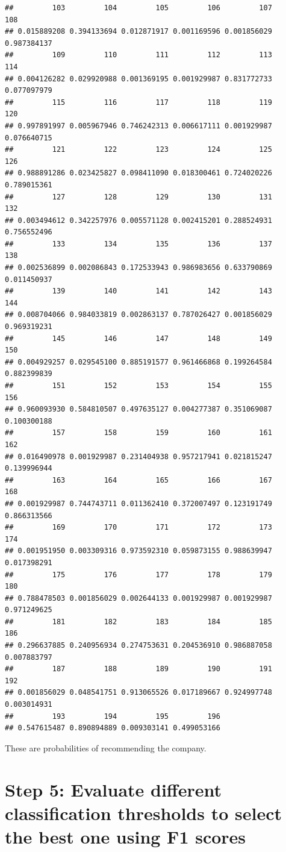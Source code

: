 \documentclass[
]{article}
\begin{document}
\begin{verbatim}
##         103         104         105         106         107         108 
## 0.015889208 0.394133694 0.012871917 0.001169596 0.001856029 0.987384137 
##         109         110         111         112         113         114 
## 0.004126282 0.029920988 0.001369195 0.001929987 0.831772733 0.077097979 
##         115         116         117         118         119         120 
## 0.997891997 0.005967946 0.746242313 0.006617111 0.001929987 0.076640715 
##         121         122         123         124         125         126 
## 0.988891286 0.023425827 0.098411090 0.018300461 0.724020226 0.789015361 
##         127         128         129         130         131         132 
## 0.003494612 0.342257976 0.005571128 0.002415201 0.288524931 0.756552496 
##         133         134         135         136         137         138 
## 0.002536899 0.002086843 0.172533943 0.986983656 0.633790869 0.011450937 
##         139         140         141         142         143         144 
## 0.008704066 0.984033819 0.002863137 0.787026427 0.001856029 0.969319231 
##         145         146         147         148         149         150 
## 0.004929257 0.029545100 0.885191577 0.961466868 0.199264584 0.882399839 
##         151         152         153         154         155         156 
## 0.960093930 0.584810507 0.497635127 0.004277387 0.351069087 0.100300188 
##         157         158         159         160         161         162 
## 0.016490978 0.001929987 0.231404938 0.957217941 0.021815247 0.139996944 
##         163         164         165         166         167         168 
## 0.001929987 0.744743711 0.011362410 0.372007497 0.123191749 0.866313566 
##         169         170         171         172         173         174 
## 0.001951950 0.003309316 0.973592310 0.059873155 0.988639947 0.017398291 
##         175         176         177         178         179         180 
## 0.788478503 0.001856029 0.002644133 0.001929987 0.001929987 0.971249625 
##         181         182         183         184         185         186 
## 0.296637885 0.240956934 0.274753631 0.204536910 0.986887058 0.007883797 
##         187         188         189         190         191         192 
## 0.001856029 0.048541751 0.913065526 0.017189667 0.924997748 0.003014931 
##         193         194         195         196 
## 0.547615487 0.890894889 0.009303141 0.499053166
\end{verbatim}

These are probabilities of recommending the company.

\section{Step 5: Evaluate different classification thresholds to select
the best one using F1
scores}\label{step-5-evaluate-different-classification-thresholds-to-select-the-best-one-using-f1-scores}
\end{document}
